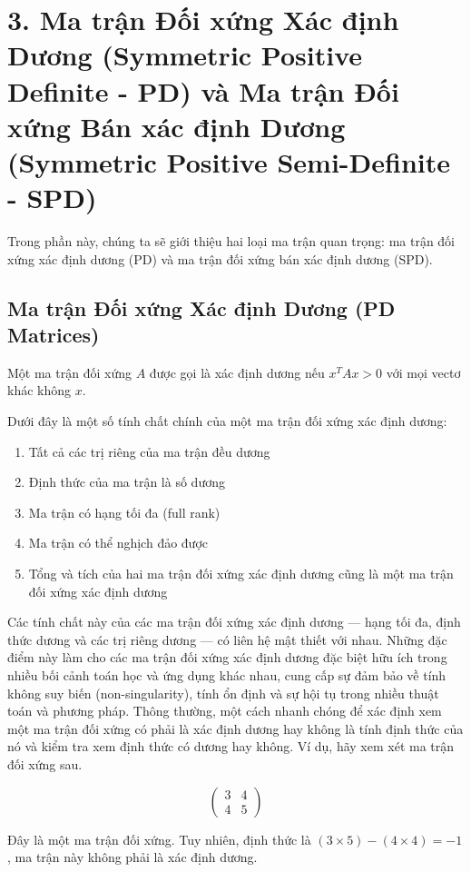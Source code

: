\section{3. Ma trận Đối xứng Xác định Dương (Symmetric Positive Definite - PD) và Ma trận Đối xứng Bán xác định Dương (Symmetric Positive Semi-Definite - SPD)}

Trong phần này, chúng ta sẽ giới thiệu hai loại ma trận quan trọng: ma trận đối xứng xác định dương (PD) và ma trận đối xứng bán xác định dương (SPD).

\subsection{Ma trận Đối xứng Xác định Dương (PD Matrices)}

Một ma trận đối xứng $A$ được gọi là xác định dương nếu $x^{T}Ax> 0$ với mọi vectơ khác không $x$.

Dưới đây là một số tính chất chính của một ma trận đối xứng xác định dương:

\begin{enumerate}
  \item Tất cả các trị riêng của ma trận đều dương
  \item Định thức của ma trận là số dương
  \item Ma trận có hạng tối đa (full rank)
  \item Ma trận có thể nghịch đảo được
  \item Tổng và tích của hai ma trận đối xứng xác định dương cũng là một ma trận đối xứng xác định dương
\end{enumerate}
Các tính chất này của các ma trận đối xứng xác định dương --- hạng tối đa, định thức dương và các trị riêng dương --- có liên hệ mật thiết với nhau. Những đặc điểm này làm cho các ma trận đối xứng xác định dương đặc biệt hữu ích trong nhiều bối cảnh toán học và ứng dụng khác nhau, cung cấp sự đảm bảo về tính không suy biến (non-singularity), tính ổn định và sự hội tụ trong nhiều thuật toán và phương pháp. Thông thường, một cách nhanh chóng để xác định xem một ma trận đối xứng có phải là xác định dương hay không là tính định thức của nó và kiểm tra xem định thức có dương hay không. Ví dụ, hãy xem xét ma trận đối xứng sau.

\[\begin{pmatrix} 3 & 4 \\ 4& 5 \end{pmatrix}\]

Đây là một ma trận đối xứng. Tuy nhiên, định thức là $(3\times 5)-(4\times 4)=-1$, ma trận này không phải là xác định dương.

